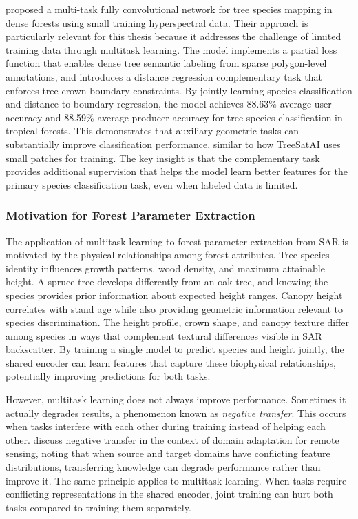 \cite{la_rosa_multi-task_2021} proposed a multi-task fully convolutional network for tree species mapping in dense forests using small training hyperspectral data. Their approach is particularly relevant for this thesis because it addresses the challenge of limited training data through multitask learning. The model implements a partial loss function that enables dense tree semantic labeling from sparse polygon-level annotations, and introduces a distance regression complementary task that enforces tree crown boundary constraints. By jointly learning species classification and distance-to-boundary regression, the model achieves 88.63\% average user accuracy and 88.59\% average producer accuracy for tree species classification in tropical forests. This demonstrates that auxiliary geometric tasks can substantially improve classification performance, similar to how TreeSatAI uses small patches for training. The key insight is that the complementary task provides additional supervision that helps the model learn better features for the primary species classification task, even when labeled data is limited.

\subsubsection{Motivation for Forest Parameter Extraction}

The application of multitask learning to forest parameter extraction from SAR is motivated by the physical relationships among forest attributes. Tree species identity influences growth patterns, wood density, and maximum attainable height. A spruce tree develops differently from an oak tree, and knowing the species provides prior information about expected height ranges. Canopy height correlates with stand age while also providing geometric information relevant to species discrimination. The height profile, crown shape, and canopy texture differ among species in ways that complement textural differences visible in SAR backscatter. By training a single model to predict species and height jointly, the shared encoder can learn features that capture these biophysical relationships, potentially improving predictions for both tasks.

However, multitask learning does not always improve performance. Sometimes it actually degrades results, a phenomenon known as \textit{negative transfer}. This occurs when tasks interfere with each other during training instead of helping each other. \cite{lyu_deep_2025} discuss negative transfer in the context of domain adaptation for remote sensing, noting that when source and target domains have conflicting feature distributions, transferring knowledge can degrade performance rather than improve it. The same principle applies to multitask learning. When tasks require conflicting representations in the shared encoder, joint training can hurt both tasks compared to training them separately.

